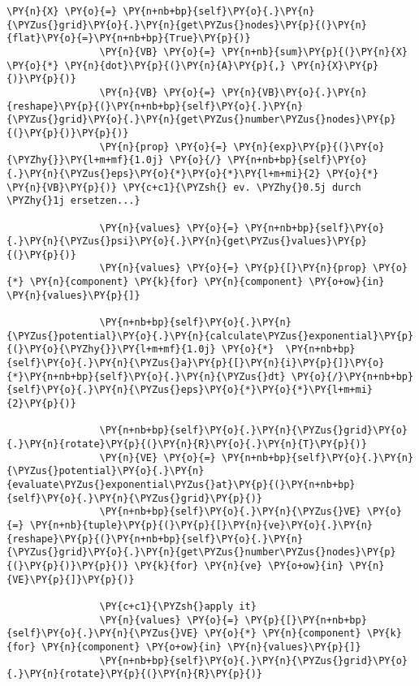 \begin{Verbatim}[commandchars=\\\{\}]
                \PY{n}{X} \PY{o}{=} \PY{n+nb+bp}{self}\PY{o}{.}\PY{n}{\PYZus{}grid}\PY{o}{.}\PY{n}{get\PYZus{}nodes}\PY{p}{(}\PY{n}{flat}\PY{o}{=}\PY{n+nb+bp}{True}\PY{p}{)}
                \PY{n}{VB} \PY{o}{=} \PY{n+nb}{sum}\PY{p}{(}\PY{n}{X} \PY{o}{*} \PY{n}{dot}\PY{p}{(}\PY{n}{A}\PY{p}{,} \PY{n}{X}\PY{p}{)}\PY{p}{)}
                \PY{n}{VB} \PY{o}{=} \PY{n}{VB}\PY{o}{.}\PY{n}{reshape}\PY{p}{(}\PY{n+nb+bp}{self}\PY{o}{.}\PY{n}{\PYZus{}grid}\PY{o}{.}\PY{n}{get\PYZus{}number\PYZus{}nodes}\PY{p}{(}\PY{p}{)}\PY{p}{)}
                \PY{n}{prop} \PY{o}{=} \PY{n}{exp}\PY{p}{(}\PY{o}{\PYZhy{}}\PY{l+m+mf}{1.0j} \PY{o}{/} \PY{n+nb+bp}{self}\PY{o}{.}\PY{n}{\PYZus{}eps}\PY{o}{*}\PY{o}{*}\PY{l+m+mi}{2} \PY{o}{*} \PY{n}{VB}\PY{p}{)} \PY{c+c1}{\PYZsh{} ev. \PYZhy{}0.5j durch \PYZhy{}1j ersetzen...}

                \PY{n}{values} \PY{o}{=} \PY{n+nb+bp}{self}\PY{o}{.}\PY{n}{\PYZus{}psi}\PY{o}{.}\PY{n}{get\PYZus{}values}\PY{p}{(}\PY{p}{)}
                \PY{n}{values} \PY{o}{=} \PY{p}{[}\PY{n}{prop} \PY{o}{*} \PY{n}{component} \PY{k}{for} \PY{n}{component} \PY{o+ow}{in} \PY{n}{values}\PY{p}{]}

                \PY{n+nb+bp}{self}\PY{o}{.}\PY{n}{\PYZus{}potential}\PY{o}{.}\PY{n}{calculate\PYZus{}exponential}\PY{p}{(}\PY{o}{\PYZhy{}}\PY{l+m+mf}{1.0j} \PY{o}{*}  \PY{n+nb+bp}{self}\PY{o}{.}\PY{n}{\PYZus{}a}\PY{p}{[}\PY{n}{i}\PY{p}{]}\PY{o}{*}\PY{n+nb+bp}{self}\PY{o}{.}\PY{n}{\PYZus{}dt} \PY{o}{/}\PY{n+nb+bp}{self}\PY{o}{.}\PY{n}{\PYZus{}eps}\PY{o}{*}\PY{o}{*}\PY{l+m+mi}{2}\PY{p}{)}

                \PY{n+nb+bp}{self}\PY{o}{.}\PY{n}{\PYZus{}grid}\PY{o}{.}\PY{n}{rotate}\PY{p}{(}\PY{n}{R}\PY{o}{.}\PY{n}{T}\PY{p}{)}
                \PY{n}{VE} \PY{o}{=} \PY{n+nb+bp}{self}\PY{o}{.}\PY{n}{\PYZus{}potential}\PY{o}{.}\PY{n}{evaluate\PYZus{}exponential\PYZus{}at}\PY{p}{(}\PY{n+nb+bp}{self}\PY{o}{.}\PY{n}{\PYZus{}grid}\PY{p}{)}
                \PY{n+nb+bp}{self}\PY{o}{.}\PY{n}{\PYZus{}VE} \PY{o}{=} \PY{n+nb}{tuple}\PY{p}{(}\PY{p}{[}\PY{n}{ve}\PY{o}{.}\PY{n}{reshape}\PY{p}{(}\PY{n+nb+bp}{self}\PY{o}{.}\PY{n}{\PYZus{}grid}\PY{o}{.}\PY{n}{get\PYZus{}number\PYZus{}nodes}\PY{p}{(}\PY{p}{)}\PY{p}{)} \PY{k}{for} \PY{n}{ve} \PY{o+ow}{in} \PY{n}{VE}\PY{p}{]}\PY{p}{)}

                \PY{c+c1}{\PYZsh{}apply it}
                \PY{n}{values} \PY{o}{=} \PY{p}{[}\PY{n+nb+bp}{self}\PY{o}{.}\PY{n}{\PYZus{}VE} \PY{o}{*} \PY{n}{component} \PY{k}{for} \PY{n}{component} \PY{o+ow}{in} \PY{n}{values}\PY{p}{]}
                \PY{n+nb+bp}{self}\PY{o}{.}\PY{n}{\PYZus{}grid}\PY{o}{.}\PY{n}{rotate}\PY{p}{(}\PY{n}{R}\PY{p}{)}


\end{Verbatim}
